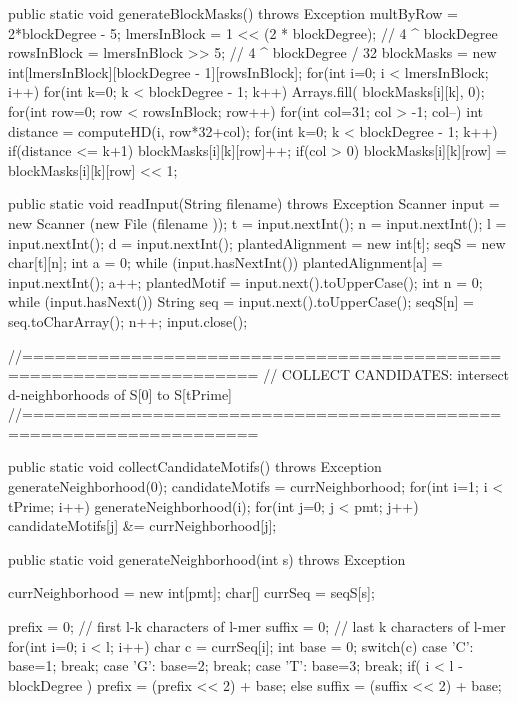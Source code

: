 \documentclass[oneside,12pt]{DISCSthesis}
\begin{document}
{\begin{footnotesize}
\begin{verbatimtab}[2]
{	public static void generateBlockMasks() throws Exception {
		multByRow = 2*blockDegree - 5;
		lmersInBlock = 1 << (2 * blockDegree);		// 4 ^ blockDegree
		rowsInBlock = lmersInBlock >> 5;			// 4 ^ blockDegree / 32
		blockMasks = new int[lmersInBlock][blockDegree - 1][rowsInBlock];
		for(int i=0; i < lmersInBlock; i++) {
			for(int k=0; k < blockDegree - 1; k++) {
				Arrays.fill( blockMasks[i][k], 0);
			}
			for(int row=0; row < rowsInBlock; row++) {
				for(int col=31; col > -1; col--) {
					int distance = computeHD(i, row*32+col);
					for(int k=0; k < blockDegree - 1; k++) {
						if(distance <= k+1) {
							blockMasks[i][k][row]++;
						}
						if(col > 0) {
							blockMasks[i][k][row] = blockMasks[i][k][row] << 1;
						}
					}
				}
			}
		}
	}

	public static void readInput(String filename) throws Exception {
		Scanner input = new Scanner (new File (filename ));
		t = input.nextInt();		
		n = input.nextInt();		
		l = input.nextInt();
		d = input.nextInt();
		plantedAlignment = new int[t];
		seqS = new char[t][n];
		int a = 0;
		while (input.hasNextInt()) {	
			plantedAlignment[a] = input.nextInt();
			a++;
		}		
		plantedMotif = input.next().toUpperCase();
		int n = 0;
		while (input.hasNext()) {
			String seq = input.next().toUpperCase();
			seqS[n] = seq.toCharArray();
			n++;
		}
		input.close();
	}




//===================================================================
// COLLECT CANDIDATES: intersect d-neighborhoods of S[0] to S[tPrime]
//===================================================================

	public static void collectCandidateMotifs() throws Exception {
		generateNeighborhood(0);		
		candidateMotifs = currNeighborhood;
		for(int i=1; i < tPrime; i++) {
			generateNeighborhood(i);
			for(int j=0; j < pmt; j++)
				candidateMotifs[j] &= currNeighborhood[j];
		}
	}

	public static void generateNeighborhood(int s) throws Exception {
		currNeighborhood = new int[pmt];
		char[] currSeq = seqS[s];

		prefix = 0; 					 	// first l-k characters of l-mer
		suffix = 0;  						// last  k characters of l-mer
		for(int i=0; i < l; i++) {
			char c = currSeq[i];
			int base = 0;
			switch(c) {
				case 'C': base=1; break;
				case 'G': base=2; break;
				case 'T': base=3; break;
			}
			if( i < l - blockDegree )
				prefix = (prefix << 2) + base;
			else
				suffix = (suffix << 2) + base;
		}

}}
\end{verbatimtab}
\end{footnotesize}}
\end{document}
